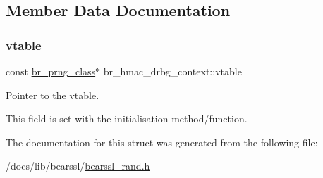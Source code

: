\subsection{Member Data Documentation}
\mbox{\label{structbr__hmac__drbg__context_a273d6a6f75ec5da343f43ca800ad9f52}} 
\subsubsection{\texorpdfstring{vtable}{vtable}}
{\footnotesize\ttfamily const \hyperlink{bearssl__rand_8h_a249aef3beeba050eea56048e6a479fba}{br\+\_\+prng\+\_\+class}$\ast$ br\+\_\+hmac\+\_\+drbg\+\_\+context\+::vtable}



Pointer to the vtable. 

This field is set with the initialisation method/function. 

The documentation for this struct was generated from the following file\+:\begin{DoxyCompactItemize}
\item 
/docs/lib/bearssl/\hyperlink{bearssl__rand_8h}{bearssl\+\_\+rand.\+h}\end{DoxyCompactItemize}
